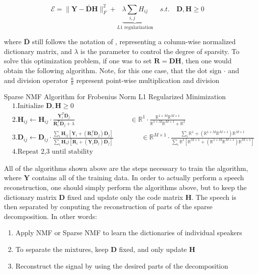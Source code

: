 $$\mathcal{E} = \| \bm{Y} - \bar{\bm{D}} \bm{H} \|_F^2 + \underbrace{\lambda \sum_{i,j} H_{ij}}_{L1\text{ regularization}} \quad s.t. \quad \bm{D},\bm{H} \geq 0$$

where $\bar{\bm{D}}$ still follows the notation of \cite{singlechannel}, representing a column-wise normalized dictionary matrix, and $\lambda$ is the parameter to control the degree of sparsity. To solve this optimization problem, if one was to set $\bm{R} = \bm{DH}$, then one would obtain the following algorithm. Note, for this one case, that the dot sign $\cdot$ and and division operator $\frac{a}{b}$ represent point-wise multiplication and division

\begin{codebox}
Sparse NMF Algorithm for Frobenius Norm L1 Regularized Minimization
\begin{align*}
    &1. \text{Initialize }\bm{D,H} \geq 0 \\
    &2. \bm{H}_{ij} \leftarrow \bm{H}_{ij} \cdot \frac{ \bm{Y}_i^T \bar{\bm{D}}_j }{  \bm{R}_i^T  \bar{\bm{D}}_j + \lambda } \quad \quad \quad \quad \quad \quad \quad \quad \in \mathbb{R}^1 \cdot \frac{\mathbb{R}^{1\times M} \mathbb{R}^{M \times 1}}{\mathbb{R}^{1\times M} \mathbb{R}^{M \times 1} + \mathbb{R}^{1}} \\
    &3. \bm{D}_{ij} \leftarrow \bm{D}_{ij} \cdot \frac{ \sum_i \bm{H}_{ij} [ \bm{Y}_i + (\bm{R}_i^T \bar{\bm{D}}_j) \bar{\bm{D}}_j] }{ \sum_i \bm{H}_ij [\bm{R}_i + (\bm{Y}_i \bar{\bm{D}}_j) \bar{\bm{D}}_j ]} \quad \quad \quad \quad \in \mathbb{R}^{M\times 1} \cdot \frac{  \sum_i \mathbb{R}^{1} + (\mathbb{R}^{1\times M} \mathbb{R}^{M\times 1})\mathbb{R}^{M\times 1}  }{ \sum_i \mathbb{R}^{1} [\mathbb{R}^{M \times 1} + (\mathbb{R}^{1\times M} \mathbb{R}^{M\times 1}) \mathbb{R}^{M\times 1}]  }\\
    &4. \text{Repeat 2,3 until stability}
\end{align*}
\end{codebox}

All of the algorithms shown above are the steps necessary to train the algorithm, where $\bm{Y}$ contains all of the training data. In order to actually perform a speech reconstruction, one should simply perform the algorithms above, but to keep the dictionary matrix $\bm{D}$ fixed and update only the code matrix $\bm{H}$. The speech is then separated by conputing the reconstruction of parts of the sparse decomposition. In other words:
\begin{enumerate}
    \item Apply NMF or Sparse NMF to learn the dictionaries of individual speakers
    \item To separate the mixtures, keep $\bm{D}$ fixed, and only update $\bm{H}$
    \item Reconstruct the signal by using the desired parts of the decomposition
\end{enumerate}


